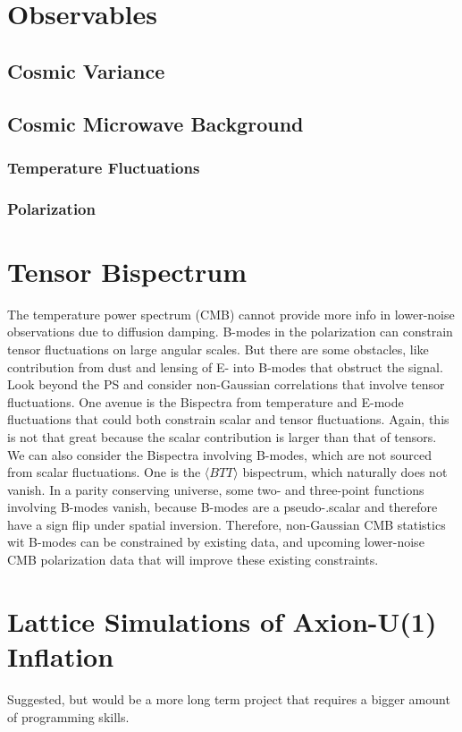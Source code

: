 \documentclass[12pt]{article}
\begin{document}
\section{Observables}
\subsection{Cosmic Variance}

\subsection{Cosmic Microwave Background}

\subsubsection{Temperature Fluctuations}
\subsubsection{Polarization}

\section{Tensor Bispectrum}
The temperature power spectrum (CMB) cannot provide more info in lower-noise observations due to diffusion damping. B-modes in the polarization can constrain tensor fluctuations on large angular scales. But there are some obstacles, like contribution from dust and lensing of E- into B-modes that obstruct the signal. Look beyond the PS and consider non-Gaussian correlations that involve tensor fluctuations. One avenue is the Bispectra from temperature and E-mode fluctuations that could both constrain scalar and tensor fluctuations. Again, this is not that great because the scalar contribution is larger than that of tensors. We can also consider the Bispectra involving B-modes, which are not sourced from scalar fluctuations. One is the $\langle BTT \rangle$ bispectrum, which naturally does not vanish. In a parity conserving universe, some two- and three-point functions involving B-modes vanish, because B-modes are a pseudo-.scalar and therefore have a sign flip under spatial inversion. Therefore, non-Gaussian CMB statistics wit B-modes can be constrained by existing data, and upcoming lower-noise CMB polarization data that will improve these existing constraints. 

\section{Lattice Simulations of Axion-U(1) Inflation}
Suggested, but would be a more long term project that requires a bigger amount of programming skills. 
\end{document}
